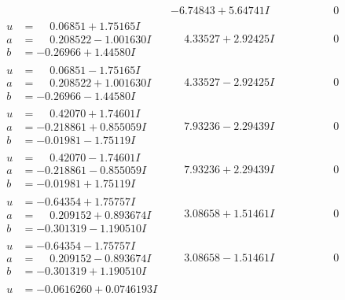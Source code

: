 \documentclass[1p]{elsarticle_modified}
\theoremstyle{definition}
\begin{document}
$$\begin{array}{c|c|c}
 & -6.74843 + 5.64741 I & \phantom{-0.000000 } 0 \\ \hline\begin{aligned}
u &= \phantom{-}0.06851 + 1.75165 I \\
a &= \phantom{-}0.208522 - 1.001630 I \\
b &= -0.26966 + 1.44580 I\end{aligned}
 & \phantom{-}4.33527 + 2.92425 I & \phantom{-0.000000 } 0 \\ \hline\begin{aligned}
u &= \phantom{-}0.06851 - 1.75165 I \\
a &= \phantom{-}0.208522 + 1.001630 I \\
b &= -0.26966 - 1.44580 I\end{aligned}
 & \phantom{-}4.33527 - 2.92425 I & \phantom{-0.000000 } 0 \\ \hline\begin{aligned}
u &= \phantom{-}0.42070 + 1.74601 I \\
a &= -0.218861 + 0.855059 I \\
b &= -0.01981 - 1.75119 I\end{aligned}
 & \phantom{-}7.93236 - 2.29439 I & \phantom{-0.000000 } 0 \\ \hline\begin{aligned}
u &= \phantom{-}0.42070 - 1.74601 I \\
a &= -0.218861 - 0.855059 I \\
b &= -0.01981 + 1.75119 I\end{aligned}
 & \phantom{-}7.93236 + 2.29439 I & \phantom{-0.000000 } 0 \\ \hline\begin{aligned}
u &= -0.64354 + 1.75757 I \\
a &= \phantom{-}0.209152 + 0.893674 I \\
b &= -0.301319 - 1.190510 I\end{aligned}
 & \phantom{-}3.08658 + 1.51461 I & \phantom{-0.000000 } 0 \\ \hline\begin{aligned}
u &= -0.64354 - 1.75757 I \\
a &= \phantom{-}0.209152 - 0.893674 I \\
b &= -0.301319 + 1.190510 I\end{aligned}
 & \phantom{-}3.08658 - 1.51461 I & \phantom{-0.000000 } 0 \\ \hline\begin{aligned}
u &= -0.0616260 + 0.0746193 I \\

\end{aligned}
\end{array}$$
\end{document}
